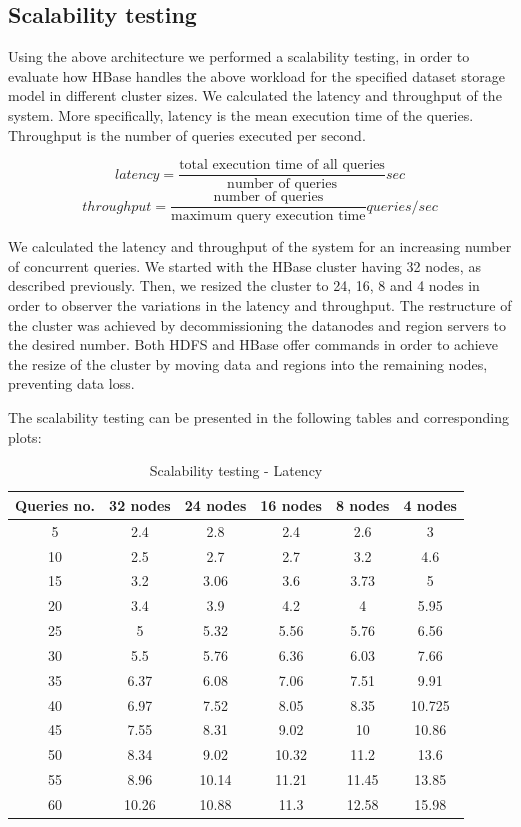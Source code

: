 \subsection{Scalability testing}

Using the above architecture we performed a scalability testing, in order to evaluate how HBase handles the above workload for the specified dataset storage model 
in different cluster sizes. We calculated the latency and throughput of the system. More specifically, latency is the mean 
execution time of the queries. Throughput is the number of queries executed per second. 

\[latency = \frac{\text{total execution time of all queries}}{\text{number of queries}} sec\]
\[throughput = \frac{\text{number of queries}}{\text{maximum query execution time}} queries/sec\]

We calculated the latency and throughput of the system for an increasing number of concurrent queries. We started with the HBase cluster having 32 nodes, as 
described previously. Then, we resized the cluster to 24, 16, 8 and 4 nodes in order to observer the variations in the latency and throughput. 
The restructure of the cluster was achieved by decommissioning the datanodes and region servers to the desired number. Both HDFS and HBase offer 
commands in order to achieve the resize of the cluster by moving data and regions into the remaining nodes, preventing data loss. 

The scalability testing can be presented in the following tables and corresponding plots:

\begin{table}[H]
\begin{center}
\begin{tabular}{|c|c|c|c|c|c|}
\hline
Queries no. & 32 nodes & 24 nodes & 16 nodes & 8 nodes & 4 nodes \\ \hline
5 & 2.4   & 2.8    & 2.4   & 2.6   & 3\\ \hline
10 & 2.5  & 2.7    & 2.7   & 3.2   & 4.6\\ \hline
15 & 3.2  & 3.06   & 3.6   & 3.73  & 5\\ \hline
20 & 3.4  & 3.9    & 4.2   & 4     & 5.95\\ \hline
25 & 5    & 5.32   & 5.56  & 5.76  & 6.56\\ \hline
30 & 5.5  & 5.76   & 6.36  & 6.03  & 7.66\\ \hline
35 & 6.37 & 6.08   & 7.06  & 7.51  & 9.91 \\ \hline
40 & 6.97 & 7.52   & 8.05  & 8.35  & 10.725 \\ \hline
45 & 7.55 & 8.31   & 9.02  & 10    & 10.86 \\ \hline
50 & 8.34 & 9.02   & 10.32 & 11.2  & 13.6 \\ \hline
55 & 8.96 & 10.14  & 11.21 & 11.45 & 13.85 \\ \hline
60 & 10.26 & 10.88 & 11.3  & 12.58 & 15.98 \\ \hline
\end{tabular}
\end{center}
\caption{Scalability testing - Latency}
\end{table}


